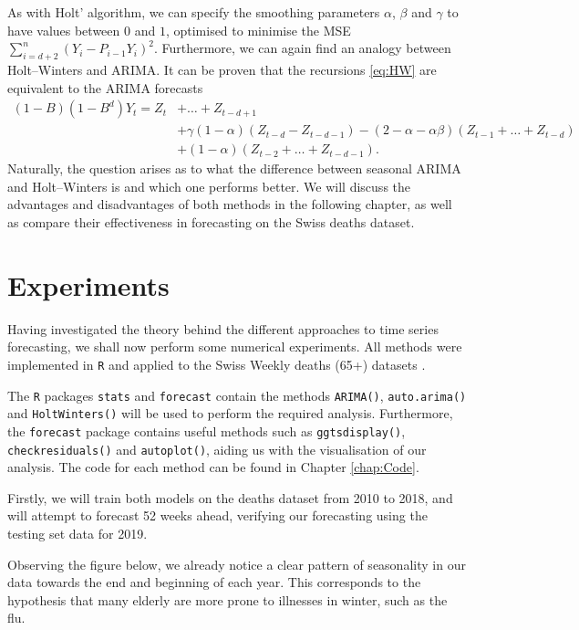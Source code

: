 \documentclass[a4paper, oneside]{discothesis}
\begin{document}
As with Holt' algorithm, we can specify the smoothing parameters $\alpha$, $\beta$ and $\gamma$ to have values between $0$ and $1$, optimised to minimise the MSE $\sum_{i=d+2}^n(Y_i - P_{i-1}Y_i)^2$. Furthermore, we can again find an analogy between Holt--Winters and ARIMA. It can be proven that the recursions \eqref{eq:HW} are equivalent to the ARIMA forecasts
\begin{align*}
    (1-B)(1-B^d)Y_t = Z_t &+ \dots + Z_{t-d+1}  \\ &+\gamma(1-\alpha)(Z_{t-d}-Z_{t-d-1}) - (2-\alpha -\alpha\beta)(Z_{t-1} +\dots + Z_{t-d}) \\
    &+ (1-\alpha)(Z_{t-2} + \dots + Z_{t-d-1}).
\end{align*}
Naturally, the question arises as to what the difference between seasonal ARIMA and Holt--Winters is and which one performs better. We will discuss the advantages and disadvantages of both methods in the following chapter, as well as compare their effectiveness in forecasting on the Swiss deaths dataset. 


\chapter{Experiments} \label{chap:exp}
Having investigated the theory behind the different approaches to time series forecasting, we shall now perform some numerical experiments. All methods were implemented in \texttt{R} and applied to the Swiss Weekly deaths (65+) datasets \cite{deaths_2010-2019} \cite{deaths_2020-2021}.


The \texttt{R} packages \texttt{stats} and \texttt{forecast} contain the methods \texttt{ARIMA()}, \texttt{auto.arima()} and \texttt{HoltWinters()} will be used to perform the required analysis. Furthermore, the \texttt{forecast} package contains useful methods such as \texttt{ggtsdisplay()}, \texttt{checkresiduals()} and \texttt{autoplot()}, aiding us with the visualisation of our analysis. The code for each method can be found in Chapter \ref{chap:Code}.

Firstly, we will train  both models on the deaths dataset from 2010 to 2018, and will attempt to forecast 52 weeks ahead, verifying our forecasting using the testing set data for 2019.

Observing the figure below, we already notice a clear pattern of seasonality in our data towards the end and beginning of each year. This corresponds to the hypothesis that many elderly are more prone to illnesses in winter, such as the flu.
\end{document}
